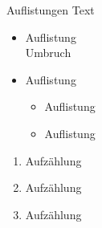 \documentclass{sdqbeamer}
\begin{document}
\begin{frame}{Auflistungen}
	Text
	\begin{itemize}
		\item Auflistung\\ Umbruch
		\item Auflistung
		\begin{itemize}
			\item Auflistung
			\item Auflistung
		\end{itemize}
	\end{itemize}
	\begin{enumerate}
		\item Aufzählung
		\item Aufzählung
		\item Aufzählung
	\end{enumerate}
\end{frame}
\end{document}
